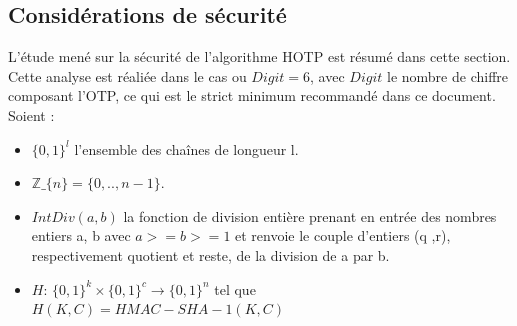 \documentclass{../res/univ-projet}
\begin{document}
  \subsection{Considérations de sécurité}
  L'\'{e}tude men\'{e} sur la s\'{e}curit\'{e} de l'algorithme HOTP est r\'{e}sum\'{e} dans cette section.
  Cette analyse est r\'{e}ali\'{e}e dans le cas ou $Digit = 6$, avec $Digit$ le nombre de chiffre composant l'OTP, ce qui est le strict minimum 
  recommand\'{e} dans ce document.\\
  Soient :
  \begin{itemize}
   \item $\{ 0,1 \} ^l$ l'ensemble des cha\^{i}nes de longueur l.
   \item $\mathds{Z}\_\{n\} = \{0, ..,n-1\}$.
   \item $IntDiv (a, b)$ la fonction de division enti\`{e}re prenant en entr\'{e}e des nombres entiers a, b avec $a >= b >= 1$ et renvoie le couple d'entiers (q ,r), 
   respectivement quotient et reste, de la division de a par b.
   \item $H$: $\{0,1\}^k \times{} \{0,1\}^c \rightarrow \{0,1\}^n$ tel que $H(K, C) = HMAC-SHA-1(K, C)$
  \end{itemize}
\end{document}
